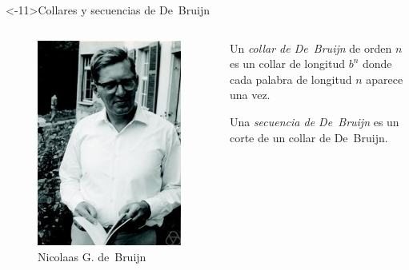 \documentclass[spanish,xcolor={table}]{beamer}
\begin{document}
\begin{frame}<-11>{Collares y secuencias de De~Bruijn}
  
  \begin{columns}
    \begin{figure}
      \includegraphics[width=\textwidth]{de-bruijn.jpg}
      \caption{Nicolaas G. de~Bruijn}
  \end{figure}
  
  \begin{definition}
    Un \emph{collar de De~Bruijn} de orden $n$ es un collar de longitud
    $b^n$ donde cada palabra de longitud $n$ aparece una vez.
    
    \medskip
    
    Una \emph{secuencia de De~Bruijn} es un corte de un collar de De~Bruijn.
  \end{definition}
  \pause
  

\end{columns}
\end{frame}
\end{document}
